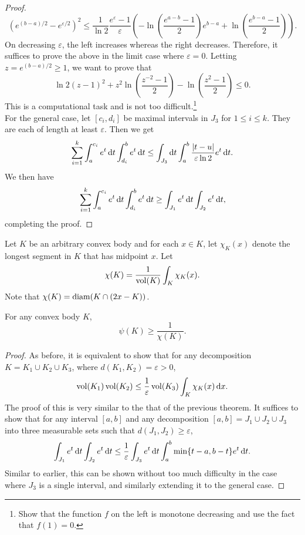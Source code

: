 \documentclass{article}
\begin{document}
\begin{proof}
			\[ (e^{(b-a)/2} - e^{\varepsilon/2})^2 \leq \frac{1}{\ln 2} \frac{e^\varepsilon-1}{\varepsilon} \left(-\ln\left(\frac{e^{a-b}-1}{2}\right)e^{b-a} + \ln\left(\frac{e^{b-a}-1}{2}\right)\right). \]
			On decreasing $\varepsilon$, the left increases whereas the right decreases. Therefore, it suffices to prove the above in the limit case where $\varepsilon=0$. Letting $z=e^{(b-a)/2}\geq 1$, we want to prove that
			\[ \ln 2 (z - 1)^2 + z^2\ln\left(\frac{z^{-2}-1}{2}\right) - \ln\left(\frac{z^2-1}{2}\right) \leq 0. \]
			This is a computational task and is not too difficult.\footnote{Show that the function $f$ on the left is monotone decreasing and use the fact that $f(1)=0$.}\\

			For the general case, let $[c_i,d_i]$ be maximal intervals in $J_3$ for $1\leq i\leq k$. They are each of length at least $\varepsilon$. Then we get
			\[ \sum_{i=1}^k \int_a^{c_i} e^t\operatorname{d}\!{t} \int_{d_i}^b e^t\operatorname{d}\!{t} \leq \int_{J_3}\operatorname{d}\!{t} \int_a^b \frac{|t-u|}{\varepsilon\ln 2}e^t\operatorname{d}\!{t}. \]
			We then have
			\[ \sum_{i=1}^k \int_a^{c_i} e^t\operatorname{d}\!{t} \int_{d_i}^b e^t\operatorname{d}\!{t} \geq \int_{J_1} e^t\operatorname{d}\!{t} \int_{J_2} e^t\operatorname{d}\!{t}, \]
			completing the proof.
		\end{proof}


		Let $K$ be an arbitrary convex body and for each $x\in K$, let $\chi_K(x)$ denote the longest segment in $K$ that has midpoint $x$. Let
		\[ \chi(K) = \frac{1}{\operatorname{vol}(K)} \int_K \chi_K(x). \]
		Note that $\chi(K)=\operatorname{diam}(K \cap (2x-K))$.

		\begin{ftheo}
			\label{isoperimetric coefficient bound 2}
			For any convex body $K$,
			\[ \psi(K) \geq \frac{1}{\chi(K)}. \]
		\end{ftheo}
		\begin{proof}
			As before, it is equivalent to show that for any decomposition $K=K_1\cup K_2\cup K_3$, where $d(K_1,K_2)=\varepsilon>0$,
			\[ \operatorname{vol}(K_1)\operatorname{vol}(K_2) \leq \frac{1}{\varepsilon}\operatorname{vol}(K_3) \int_K \chi_K(x)\operatorname{d}\!{x}. \]
			The proof of this is very similar to the that of the previous theorem. It suffices to show that for any interval $[a,b]$ and any decomposition $[a,b]=J_1\cup J_2\cup J_3$ into three measurable sets such that $d(J_1,J_2)\geq \varepsilon$,
			\[ \int_{J_1} e^t\operatorname{d}\!{t} \int_{J_2} e^t\operatorname{d}\!{t} \leq \frac{1}{\varepsilon} \int_{J_3} e^t\operatorname{d}\!{t} \int_a^b \min\{t-a, b-t\}e^t\operatorname{d}\!{t}. \]
			Similar to earlier, this can be shown without too much difficulty in the case where $J_3$ is a single interval, and similarly extending it to the general case.
		\end{proof}
\end{document}
